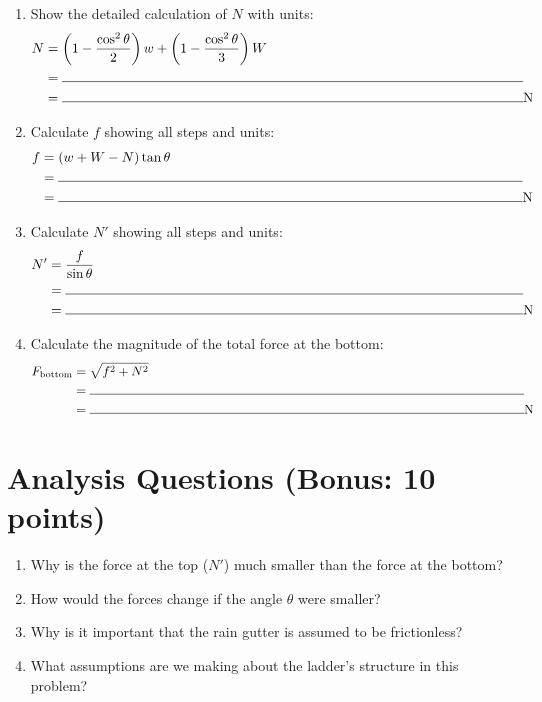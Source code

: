 \documentclass{article}
\begin{document}
\begin{enumerate}[label=\arabic*., leftmargin=*, start=8]
    \item Show the detailed calculation of $N$ with units:
    \begin{align*}
        N &= \left(1 - \frac{\cos^2 \theta}{2}\right)w + \left(1 - \frac{\cos^2 \theta}{3}\right)W \\
        &= \rule{12cm}{0.15mm} \\
        &= \rule{12cm}{0.15mm} \si{\newton}
    \end{align*}
    
    \item Calculate $f$ showing all steps and units:
    \begin{align*}
        f &= (w + W - N)\tan \theta \\
        &= \rule{12cm}{0.15mm} \\
        &= \rule{12cm}{0.15mm} \si{\newton}
    \end{align*}
    
    \item Calculate $N'$ showing all steps and units:
    \begin{align*}
        N' &= \frac{f}{\sin \theta} \\
        &= \rule{12cm}{0.15mm} \\
        &= \rule{12cm}{0.15mm} \si{\newton}
    \end{align*}
    
    \item Calculate the magnitude of the total force at the bottom:
    \begin{align*}
        F_{\text{bottom}} &= \sqrt{f^2 + N^2} \\
        &= \rule{12cm}{0.15mm} \\
        &= \rule{12cm}{0.15mm} \si{\newton}
    \end{align*}
\end{enumerate}

\section*{Analysis Questions (Bonus: 10 points)}

\begin{enumerate}[label=\alph*.]
    \item Why is the force at the top ($N'$) much smaller than the force at the bottom?
    \item How would the forces change if the angle $\theta$ were smaller?
    \item Why is it important that the rain gutter is assumed to be frictionless?
    \item What assumptions are we making about the ladder's structure in this problem?
\end{enumerate}
\end{document}
